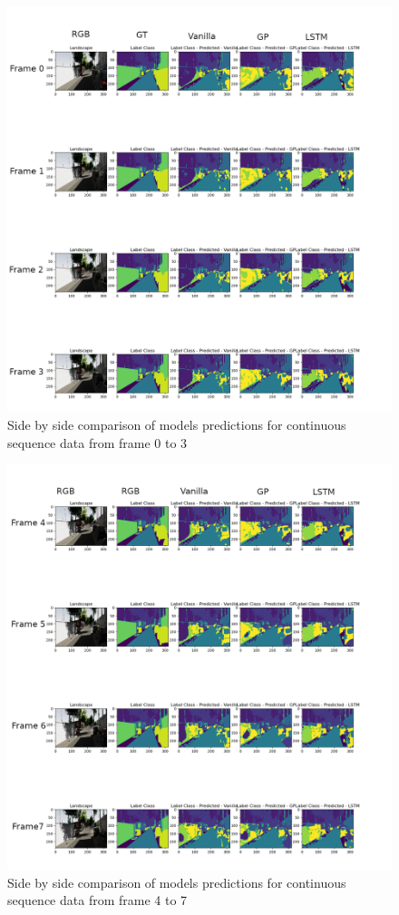 	\begin{figure}
		\centering
		\includegraphics[width=19cm]{images/continuous_sequence_data1.png}
		\caption{Side by side comparison of models predictions for continuous sequence data from frame 0 to 3}
		\label{fig:performance_metric_three_classes}
	\end{figure}

	\begin{figure}
		\hspace*{-1cm} 
		\includegraphics[width=19cm]{images/continuous_sequence_data2.png}
		\caption{Side by side comparison of models predictions for continuous sequence data from frame 4 to 7}
		\label{fig:performance_metric_three_classes}
	\end{figure}

